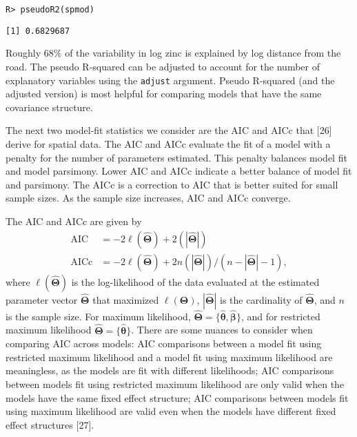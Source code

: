 \documentclass[10pt,letterpaper]{article}
\begin{document}
\begin{verbatim}
R> pseudoR2(spmod)
\end{verbatim}

\begin{verbatim}
[1] 0.6829687
\end{verbatim}

Roughly 68\% of the variability in log zinc is explained by log distance
from the road. The pseudo R-squared can be adjusted to account for the
number of explanatory variables using the \texttt{adjust} argument.
Pseudo R-squared (and the adjusted version) is most helpful for
comparing models that have the same covariance structure.

The next two model-fit statistics we consider are the AIC and AICc that
{[}26{]} derive for spatial data. The AIC and AICc evaluate the fit of a
model with a penalty for the number of parameters estimated. This
penalty balances model fit and model parsimony. Lower AIC and AICc
indicate a better balance of model fit and parsimony. The AICc is a
correction to AIC that is better suited for small sample sizes. As the
sample size increases, AIC and AICc converge.

The AIC and AICc are given by \begin{equation*}\label{eq:sp_aic}
  \begin{split}
    \text{AIC} & = -2\ell(\hat{\boldsymbol{\Theta}}) + 2(|\hat{\boldsymbol{\Theta}}|) \\
    \text{AICc} & = -2\ell(\hat{\boldsymbol{\Theta}}) + 2n(|\hat{\boldsymbol{\Theta}}|) / (n - |\hat{\boldsymbol{\Theta}}| - 1),
  \end{split}
\end{equation*} where \(\ell(\hat{\boldsymbol{\Theta}})\) is the
log-likelihood of the data evaluated at the estimated parameter vector
\(\hat{\boldsymbol{\Theta}}\) that maximized
\(\ell(\boldsymbol{\Theta})\), \(|\hat{\boldsymbol{\Theta}}|\) is the
cardinality of \(\hat{\boldsymbol{\Theta}}\), and \(n\) is the sample
size. For maximum likelihood,
\(\hat{\boldsymbol{\Theta}} = \{\hat{\boldsymbol{\theta}}, \hat{\boldsymbol{\beta}}\}\),
and for restricted maximum likelihood
\(\hat{\boldsymbol{\Theta}} = \{\hat{\boldsymbol{\theta}}\}\). There are
some nuances to consider when comparing AIC across models: AIC
comparisons between a model fit using restricted maximum likelihood and
a model fit using maximum likelihood are meaningless, as the models are
fit with different likelihoods; AIC comparisons between models fit using
restricted maximum likelihood are only valid when the models have the
same fixed effect structure; AIC comparisons between models fit using
maximum likelihood are valid even when the models have different fixed
effect structures {[}27{]}.
\end{document}
